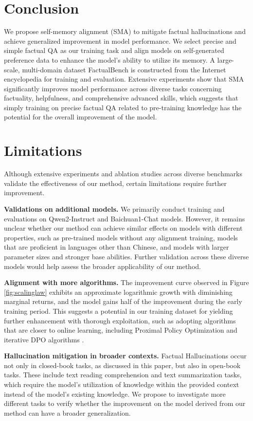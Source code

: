 \section{Conclusion}
We propose self-memory alignment (SMA) to mitigate factual hallucinations and achieve generalized improvement in model performance. We select precise and simple factual QA as our training task and align models on self-generated preference data to enhance the model's ability to utilize its memory. A large-scale, multi-domain dataset FactualBench is constructed from the Internet encyclopedia for training and evaluation. Extensive experiments show that SMA significantly improves model performance across diverse tasks concerning factuality, helpfulness, and comprehensive advanced skills, which suggests that simply training on precise factual QA related to pre-training knowledge has the potential for the overall improvement of the model.

\FloatBarrier

\section*{Limitations}
Although extensive experiments and ablation studies across diverse benchmarks validate the effectiveness of our method, certain limitations require further improvement.

\textbf{Validations on additional models.} We primarily conduct training and evaluations on Qwen2-Instruct and Baichuan1-Chat models. However, it remains unclear whether our method can achieve similar effects on models with different properties, such as pre-trained models without any alignment training, models that are proficient in languages other than Chinese, and models with larger parameter sizes and stronger base abilities. Further validation across these diverse models would help assess the broader applicability of our method.

\textbf{Alignment with more algorithms.} The improvement curve observed in Figure \ref{fig:scalinglaw} exhibits an approximate logarithmic growth with diminishing marginal returns, and the model gains half of the improvement during the early training period. This suggests a potential in our training dataset for yielding further enhancement with thorough exploitation, such as adopting algorithms that are closer to online learning, including Proximal Policy Optimization \citep{schulman2017proximal} and iterative DPO algorithms \citep{iterativedpo, iterdpo2}.

\textbf{Hallucination mitigation in broader contexts.} Factual Hallucinations occur not only in closed-book tasks, as discussed in this paper, but also in open-book tasks. These include text reading comprehension and text summarization tasks, which require the model's utilization of knowledge within the provided context instead of the model's existing knowledge. We propose to investigate more different tasks to verify whether the improvement on the model derived from our method can have a broader generalization.

